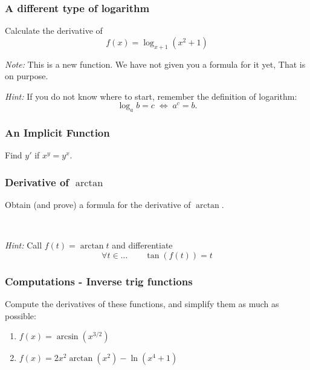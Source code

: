 \documentclass[14pt]{beamer}
\newcommand {\DS} [1] {${\displaystyle #1}$}
\newcommand{\p}{\pause}
\begin{document}
\begin{frame}[t]
\frametitle{A different type of logarithm}

Calculate the derivative of 
	$$
		f(x) = \log_{x+1} (x^2+1)
	$$
	
\vfill

\emph{Note:}  This is a new function.  We have not given you a formula for it yet,  That is on purpose.

\vfill \p

\emph{Hint:}  If you do not know where to start, remember the definition of logarithm:
	$$
	\log_a b = c \; \iff \; a^c = b.
	$$
	

\end{frame}

\begin{frame}[t]
\frametitle{An Implicit Function}

\vspace{5mm} 
\begin{block}{}
Find $y'$ if $x^y=y^x$.
\end{block}
\end{frame}



\begin{frame}[t]
\frametitle{Derivative of $\arctan$}

\begin{block}{}
Obtain (and prove) a formula for the derivative of $\arctan$.
\end{block}

\

\emph{Hint:}  Call \DS{f(t) = \arctan t} and differentiate
	$$
		\forall t \in \ldots \quad \quad \tan ( f(t)) = t
	$$
\end{frame}
\begin{frame}[t]
\frametitle{Computations - Inverse trig functions}


Compute the derivatives of these functions, and simplify them as much as possible:
	\begin{enumerate}
		\item  \DS{f(x) = \arcsin \left( x^{3/2}\right) }
		\vfill
		\item  \DS{ f(x)=2x^2 \arctan (x^2) - \ln (x^4+1) }
		\vfill
	\end{enumerate}

\end{frame}
\end{document}
